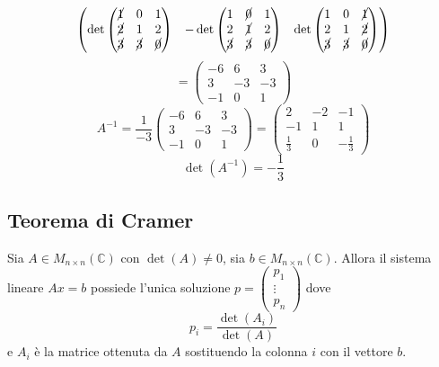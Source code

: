 \documentclass[a4paper]{article}
\theoremstyle{break}
\theoremstyle{break}
\theoremstyle{break}
\theoremstyle{break}
\begin{document}
\begin{figure}[H]
\begin{example}
\[\begin{pmatrix}
      \det\begin{pmatrix} 
        \cancel{1} & 0 & 1 \\
        \cancel{2} & 1 & 2\\
        \cancel{3} & \cancel{3} & \cancel{0}
      \end{pmatrix} &
      -\det\begin{pmatrix} 
        1 & \cancel{0} & 1 \\
        2 & \cancel{1} & 2\\
        \cancel{3} & \cancel{3} & \cancel{0}
      \end{pmatrix} &
      \det\begin{pmatrix} 
        1 & 0 & \cancel{1} \\
        2 & 1 & \cancel{2}\\
        \cancel{3} & \cancel{3} & \cancel{0}
        \end{pmatrix}\\
    \end{pmatrix} 
    \] 
    \[
    = \begin{pmatrix} 
      -6 & 6 & 3\\
      3 & -3 & -3\\
      -1 & 0 & 1
    \end{pmatrix}
    \] 
    \[
      A^{-1} = \frac{1}{-3} \begin{pmatrix} 
        -6 & 6 & 3\\
        3 & -3 & -3\\
        -1 & 0 & 1
      \end{pmatrix}
      =
      \begin{pmatrix} 
        2 & -2 & -1\\
        -1 & 1 & 1\\
        \frac{1}{3} & 0 & -\frac{1}{3}
      \end{pmatrix}
    \] 
    \[
    \det(A^{-1}) = -\frac{1}{3}
    \] 
  \end{example}
\end{figure}

\subsection{Teorema di Cramer}
Sia \( A \in M_{n \times n}(\mathbb{C}) \) con \( \det(A) \neq 0 \), sia \( b \in M_{n \times n}(\mathbb{C}) \).
Allora il sistema lineare \( Ax = b \) possiede l'unica soluzione \( p = \begin{pmatrix} 
  p_1\\
  \vdots\\
  p_n
  \end{pmatrix}  \) dove \[ p_i = \frac{\det(A_i)}{\det(A)} \] e \( A_i \) è la matrice
  ottenuta da \( A \) sostituendo la colonna \( i \) con il vettore \( b \).
\end{document}
